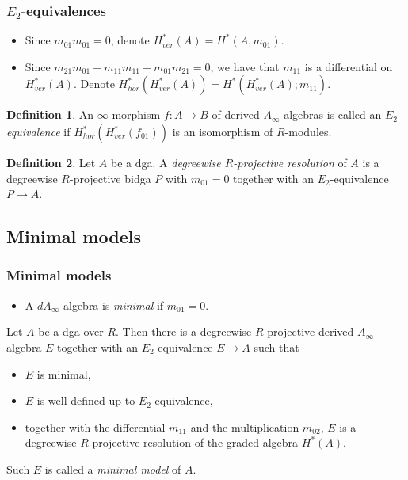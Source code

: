 \documentclass{beamer}
\theoremstyle{definition}
\newtheorem{defi}{Definition}
\begin{document}
\begin{frame}
\frametitle{$E_2$-equivalences}
\begin{itemize}
\item<1-> Since $m_{01}m_{01}=0$, denote $H^*_{ver}(A)=H^*(A,m_{01})$. 
\item<2-> Since $m_{21}m_{01} - m_{11}m_{11} + m_{01}m_{21} = 0$, we have that $m_{11}$ is a differential on $H^*_{ver}(A)$. Denote $H^*_{hor}(H^*_{ver}(A)) = H^*(H^*_{ver}(A);m_{11})$.
\end{itemize}\pause
\pause
\begin{defi}
An $\infty$-morphism $f : A \to B$ of derived $A_\infty$-algebras
is called an \emph{$E_2$-equivalence} if $H^*_{hor}(H^*_{ver}(f_{01}))$
is an isomorphism of $R$-modules.
\end{defi}\pause
\begin{defi}
Let $A$ be a dga. A \emph{degreewise $R$-projective
resolution} of $A$ is a degreewise $R$-projective
bidga $P$ with $m_{01} = 0$ together with an $E_2$-equivalence $P \to A$.
\end{defi}
\end{frame}
\subsection{Minimal models}
\begin{frame}
\frametitle{Minimal models}
\begin{itemize}
\item A $dA_\infty$-algebra is \emph{minimal} if $m_{01} = 0$. 
\end{itemize}\pause
\begin{theorem}[Sagave]
Let $A$ be a dga over $R$. Then there is a degreewise
$R$-projective derived $A_\infty$-algebra $E$ together with an $E_2$-equivalence $E \to A$ such that
\begin{itemize}
\item $E$ is minimal,
\item $E$ is well-defined up to $E_2$-equivalence,
\item together with the differential $m_{11}$ and the multiplication $m_{02}$, $E$ is a degreewise $R$-projective
resolution of the graded algebra $H^*(A)$. 
\end{itemize}
\end{theorem}\pause
Such $E$ is called a \emph{minimal model} of $A$.
\end{frame}
\end{document}
